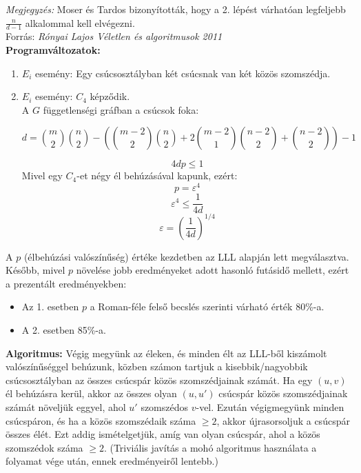 \documentclass[12pt,a4paper]{article}
\begin{document}
    \noindent \textit{Megjegyzés:} Moser és Tardos bizonyították, hogy a 2. lépést várhatóan legfeljebb $\frac{n}{d-1}$ alkalommal kell elvégezni.
    \\[5mm]
    \noindent Forrás: \textit{Rónyai Lajos Véletlen és algoritmusok 2011} \cite{ronyai2011veletlen}
    \\[5mm]
    \textbf{Programváltozatok:}
    \begin{enumerate}
        \item $E_i$ esemény: Egy csúcsosztályban két csúcsnak van két közös szomszédja.
        \item $E_i$ esemény: $C_4$ képződik.\\
        A $G$ függetlenségi gráfban a csúcsok foka:

        \[
        d = \binom{m}{2} \binom{n}{2} 
        - \left( 
        \binom{m-2}{2} \binom{n}{2} 
        + 2 \binom{m-2}{1} \binom{n-2}{2} 
        + \binom{n-2}{2} 
        \right) - 1
        \]
        
        \[
        4dp \leq 1
        \]
Mivel egy $C_4$-et négy él behúzásával kapunk, ezért:
        \[
         p = \varepsilon^4
        \]
        \[
        \varepsilon^4 \leq \frac{1}{4d}
        \]
        \[
        \varepsilon = \left( \frac{1}{4d} \right)^{1/4}
        \]
    \end{enumerate}

    A $p$ (élbehúzási valószínűség) értéke kezdetben az LLL alapján lett megválasztva. Később, mivel $p$ növelése jobb eredményeket adott hasonló futásidő mellett, ezért a prezentált eredményekben:
    \begin{itemize}
        \item Az 1. esetben $p$ a Roman-féle felső becslés szerinti várható érték 80\%-a.
        \item A 2. esetben 85\%-a.
    \end{itemize}

\textbf{Algoritmus:} Végig megyünk az éleken, és minden élt az LLL-ből kiszámolt valószínűséggel behúzunk, közben számon tartjuk a kisebbik/nagyobbik csúcsosztályban az összes csúcspár közös szomszédjainak számát. Ha egy $(u,v)$ él behúzásra kerül, akkor az összes olyan $(u,u')$ csúcspár közös szomszédjainak számát növeljük eggyel, ahol $u'$ szomszédos $v$-vel. Ezután végigmegyünk minden csúcspáron, és ha a közös szomszédaik száma $\geq 2$, akkor újrasorsoljuk a csúcspár összes élét. Ezt addig ismételgetjük, amíg van olyan csúcspár, ahol a közös szomszédok száma $\geq 2$. (Triviális javítás a mohó algoritmus használata a folyamat vége után, ennek eredményeiről lentebb.)
\end{document}
